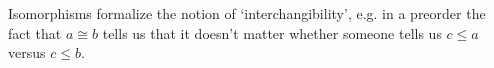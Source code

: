 Isomorphisms formalize the notion of `interchangibility', e.g. in a preorder the fact that $a \cong b$ tells us that it doesn't matter whether someone tells us $c \leq a$ versus $c \leq b$.

